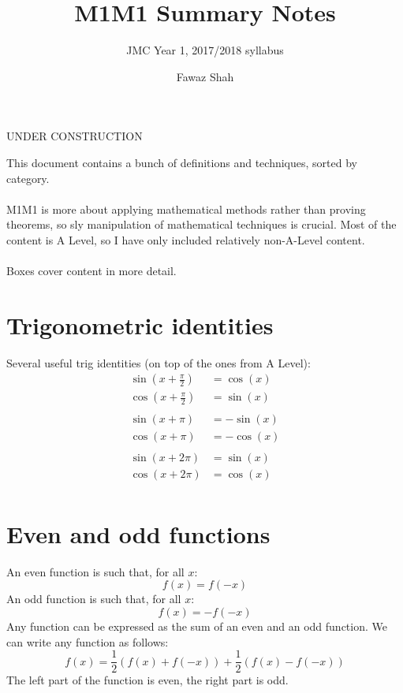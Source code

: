 \documentclass{scrartcl}
\title{M1M1 Summary Notes}
\subtitle{JMC Year 1, 2017/2018 syllabus}
\date{}
\author{Fawaz Shah}
\begin{document}
\large
\maketitle
\begin{center}
UNDER CONSTRUCTION
\end{center}
\noindent This document contains a bunch of definitions and techniques, sorted by category.
\\\\
M1M1 is more about applying mathematical methods rather than proving theorems, so sly manipulation of mathematical techniques is crucial. Most of the content is A Level, so I have only included relatively non-A-Level content.
\\\\
Boxes cover content in more detail.
\tableofcontents
\newpage

\section{Trigonometric identities}
Several useful trig identities (on top of the ones from A Level):
\begin{align}
\sin(x + \frac{\pi}{2}) & = \cos(x) \\
\cos(x + \frac{\pi}{2}) & = \sin(x) \\
\\
\sin(x + \pi) & = - \sin(x) \\
\cos(x + \pi) & = - \cos(x) \\
\\
\sin(x + 2 \pi) & = \sin(x) \\
\cos(x + 2 \pi) & = \cos(x) \\
\end{align}

\section{Even and odd functions}
An even function is such that, for all $ x $:
\begin{equation}
f(x) = f(-x)
\end{equation}
An odd function is such that, for all $ x $:
\begin{equation}
f(x) = -f(-x)
\end{equation}
Any function can be expressed as the sum of an even and an odd function. We can write any function as follows:
\begin{equation}
f(x) = \frac{1}{2}(f(x) + f(-x)) + \frac{1}{2}(f(x) - f(-x))
\end{equation}
The left part of the function is even, the right part is odd.
\end{document}
